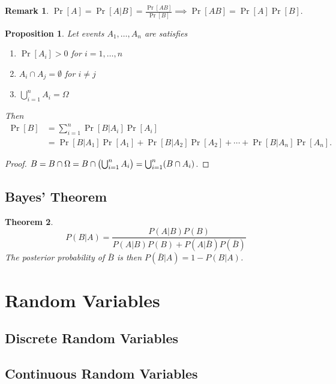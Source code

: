 \documentclass[12pt,openany]{book}
\newtheorem{theorem}{Theorem}[chapter]
\newtheorem{proposition}[theorem]{Proposition}
\theoremstyle{definition}
\newtheorem{remark}{Remark}[chapter]
\begin{document}
	\begin{remark}
		$\displaystyle\Pr[A]=\Pr[A|B]=\frac{\Pr[AB]}{\Pr[B]}\implies \Pr[AB]=\Pr[A]\Pr[B]$.
	\end{remark}
	\vspace{20pt}
	\begin{tcolorbox}[colback=white,colframe=procolor,arc=5pt,title={\color{white}\bf Rule of Total Probailtiy}]
		\begin{proposition}
			Let events $A_1,\dots,A_n$ are satisfies
			\begin{enumerate}[(1)]
				\item $\Pr[A_i]>0$ for $i=1,\dots,n$
				\item $A_i\cap A_j=\emptyset$ for $i\neq j$
				\item $\bigcup_{i=1}^nA_i=\Omega$
			\end{enumerate} Then \begin{align*}
				\Pr[B]&=\sum_{i=1}^n\Pr[B|A_i]\Pr[A_i]\\
				&=\Pr[B|A_1]\Pr[A_1]+\Pr[B|A_2]\Pr[A_2]+\cdots+\Pr[B|A_n]\Pr[A_n].
			\end{align*}
		\end{proposition}
	\end{tcolorbox}
	\begin{proof}
		$B=B\cap\Omega=B\cap\del{\bigcup_{i=1}^nA_i}=\bigcup_{i=1}^n(B\cap A_i)$.
	\end{proof}
	\vspace{20pt}
	\subsection{Bayes' Theorem}
	\begin{tcolorbox}[colback=white,colframe=thmcolor,arc=5pt,title={\color{white}\bf Bayes' Theorem}]
		\begin{theorem}
			\[
			P(B|A) = \frac{P(A|B)P(B)}{P(A|B)P(B)+P(A|\bar{B})P(\bar{B})}
			\] The posterior probability of $\bar{B}$ is then $P(\bar{B}|A)=1-P(B|A)$.
		\end{theorem}
	\end{tcolorbox}
	
	\newpage
	\section{Random Variables}
	\subsection{Discrete Random Variables}
	\subsection{Continuous Random Variables}
	
\end{document}

